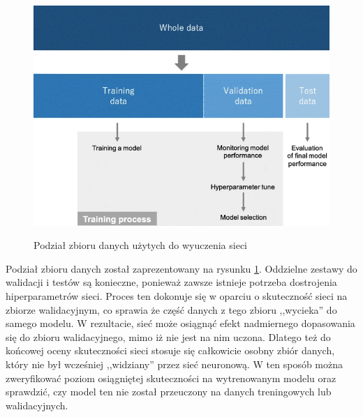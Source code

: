 \begin{figure}[h]
\begin{center}
\includegraphics[width=15cm]{resources/figures/datasets.png}
\caption{Podział zbioru danych użytych do wyuczenia sieci}
\label{DatasetDivision}
\end{center}
\end{figure}

Podział zbioru danych został zaprezentowany na rysunku \ref{DatasetDivision}. Oddzielne zestawy do walidacji i testów są konieczne, ponieważ zawsze istnieje potrzeba dostrojenia hiperparametrów sieci. Proces ten dokonuje się w oparciu o skuteczność sieci na zbiorze walidacyjnym, co sprawia że część danych z tego zbioru ,,wycieka'' do samego modelu. W rezultacie, sieć może osiągnąć efekt nadmiernego dopasowania się \cite{goyal:overfittingGuide} do zbioru walidacyjnego, mimo iż nie jest na nim uczona. Dlatego też do końcowej oceny skuteczności sieci stosuje się całkowicie osobny zbiór danych, który nie był wcześniej ,,widziany'' przez sieć neuronową. W ten sposób można zweryfikować poziom osiągniętej skuteczności na wytrenowanym modelu oraz sprawdzić, czy model ten nie został przeuczony na danych treningowych lub walidacyjnych.

